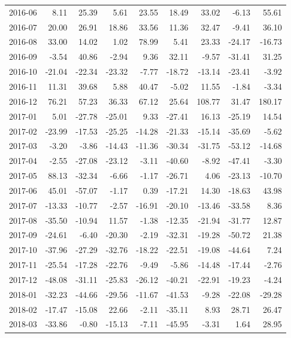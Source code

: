 \begin{table}[ht]
\begin{tabular}{lrrrrrrrr}
  2016-06 & 8.11 & 25.39 & 5.61 & 23.55 & 18.49 & 33.02 & -6.13 & 55.61 \\ 
  2016-07 & 20.00 & 26.91 & 18.86 & 33.56 & 11.36 & 32.47 & -9.41 & 36.10 \\ 
  2016-08 & 33.00 & 14.02 & 1.02 & 78.99 & 5.41 & 23.33 & -24.17 & -16.73 \\ 
  2016-09 & -3.54 & 40.86 & -2.94 & 9.36 & 32.11 & -9.57 & -31.41 & 31.25 \\ 
  2016-10 & -21.04 & -22.34 & -23.32 & -7.77 & -18.72 & -13.14 & -23.41 & -3.92 \\ 
  2016-11 & 11.31 & 39.68 & 5.88 & 40.47 & -5.02 & 11.55 & -1.84 & -3.34 \\ 
  2016-12 & 76.21 & 57.23 & 36.33 & 67.12 & 25.64 & 108.77 & 31.47 & 180.17 \\ 
  2017-01 & 5.01 & -27.78 & -25.01 & 9.33 & -27.41 & 16.13 & -25.19 & 14.54 \\ 
  2017-02 & -23.99 & -17.53 & -25.25 & -14.28 & -21.33 & -15.14 & -35.69 & -5.62 \\ 
  2017-03 & -3.20 & -3.86 & -14.43 & -11.36 & -30.34 & -31.75 & -53.12 & -14.68 \\ 
  2017-04 & -2.55 & -27.08 & -23.12 & -3.11 & -40.60 & -8.92 & -47.41 & -3.30 \\ 
  2017-05 & 88.13 & -32.34 & -6.66 & -1.17 & -26.71 & 4.06 & -23.13 & -10.70 \\ 
  2017-06 & 45.01 & -57.07 & -1.17 & 0.39 & -17.21 & 14.30 & -18.63 & 43.98 \\ 
  2017-07 & -13.33 & -10.77 & -2.57 & -16.91 & -20.10 & -13.46 & -33.58 & 8.36 \\ 
  2017-08 & -35.50 & -10.94 & 11.57 & -1.38 & -12.35 & -21.94 & -31.77 & 12.87 \\ 
  2017-09 & -24.61 & -6.40 & -20.30 & -2.19 & -32.31 & -19.28 & -50.72 & 21.38 \\ 
  2017-10 & -37.96 & -27.29 & -32.76 & -18.22 & -22.51 & -19.08 & -44.64 & 7.24 \\ 
  2017-11 & -25.54 & -17.28 & -22.76 & -9.49 & -5.86 & -14.48 & -17.44 & -2.76 \\ 
  2017-12 & -48.08 & -31.11 & -25.83 & -26.12 & -40.21 & -22.91 & -19.23 & -4.24 \\ 
  2018-01 & -32.23 & -44.66 & -29.56 & -11.67 & -41.53 & -9.28 & -22.08 & -29.28 \\ 
  2018-02 & -17.47 & -15.08 & 22.66 & -2.11 & -35.11 & 8.93 & 28.71 & 26.47 \\ 
  2018-03 & -33.86 & -0.80 & -15.13 & -7.11 & -45.95 & -3.31 & 1.64 & 28.95 \\ 

\end{tabular}
\end{table}
